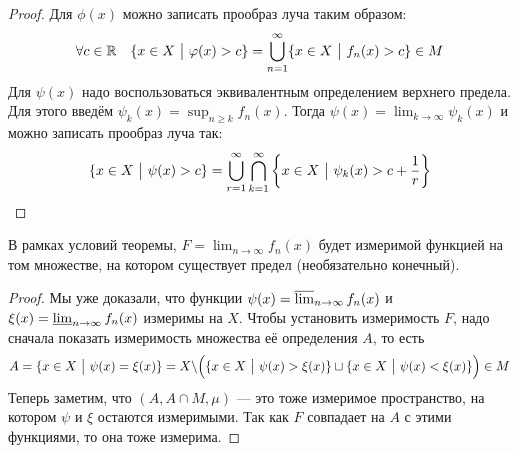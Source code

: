 \begin{proof}
	Для $\phi(x)$ можно записать прообраз луча таким образом:
	\[
		\forall c \in \mathbb{R} \quad \{x \in X \ \big|\  \varphi(x) > c\} = \bigcup_{n = 1}^\infty \{x \in X \ \big|\  f_n(x) > c\} \in M
	\]
	Для $\psi(x)$ надо воспользоваться эквивалентным определением верхнего предела. Для этого введём $\psi_k(x) = \sup_{n \ge k} f_n(x)$. Тогда $\psi(x) = \lim_{k \to \infty} \psi_k(x)$ и можно записать прообраз луча так:
	\[
		\{x \in X \ \big|\  \psi(x) > c\} = \bigcup_{r = 1}^\infty \bigcap_{k = 1}^\infty \left\{x \in X \ \big|\  \psi_k(x) > c + \frac{1}{r}\right\}
	\]
\end{proof}

\begin{corollary}
	В рамках условий теоремы, $F = \lim_{n \to \infty} f_n(x)$ будет измеримой функцией на том множестве, на котором существует предел (необязательно конечный).
\end{corollary}

\begin{proof}
	Мы уже доказали, что функции $\psi(x) = \varlimsup_{n \to \infty} f_n(x)$ и $\xi(x) = \varliminf_{n \to \infty} f_n(x)$ измеримы на $X$. Чтобы установить измеримость $F$, надо сначала показать измеримость множества её определения $A$, то есть
	\[
		A = \{x \in X \ \big|\  \psi(x) = \xi(x)\} = X \backslash \Big(\{x \in X \ \big|\  \psi(x) > \xi(x)\} \sqcup \{x \in X \ \big|\  \psi(x) < \xi(x)\}\Big) \in M
	\]
	Теперь заметим, что $(A, A \cap M, \mu)$ --- это тоже измеримое пространство, на котором $\psi$ и $\xi$ остаются измеримыми. Так как $F$ совпадает на $A$ с этими функциями, то она тоже измерима.
\end{proof}